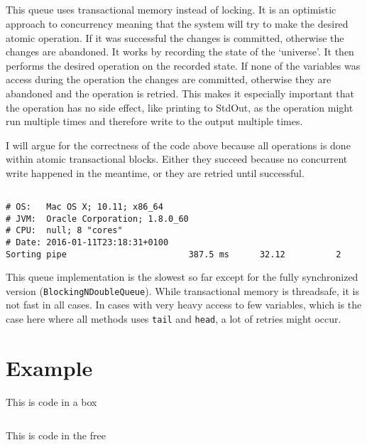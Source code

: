 \documentclass{ituhandin}
\begin{document}
\section{}
This queue uses transactional memory instead of locking. It is an optimistic approach to concurrency meaning that the system will try to make the desired atomic operation. If it was successful the changes is committed, otherwise the changes are abandoned. It works by recording the state of the `universe'. It then performs the desired operation on the recorded state. If none of the variables was access during the operation the changes are committed, otherwise they are abandoned and the operation is retried. This makes it especially important that the operation has no side effect, like printing to StdOut, as the operation might run multiple times and therefore write to the output multiple times.

I will argue for the correctness of the code above because all operations is done within atomic transactional blocks. Either they succeed because no concurrent write happened in the meantime, or they are retried until successful.

\section{}
\begin{lstlisting}[language={},frame={}]
# OS:   Mac OS X; 10.11; x86_64
# JVM:  Oracle Corporation; 1.8.0_60
# CPU:  null; 8 "cores"
# Date: 2016-01-11T23:18:31+0100
Sorting pipe                        387.5 ms      32.12          2
\end{lstlisting}

This queue implementation is the slowest so far except for the fully synchronized version (\texttt{BlockingNDoubleQueue}). While transactional memory is threadsafe, it is not fast in all cases. In cases with very heavy access to few variables, which is the case here where all methods uses \texttt{tail} and \texttt{head}, a lot of retries might occur.

\chapter{} %
\chapter{} %

\chapter*{Example}

This is code in a box

\begin{lstlisting}[caption=This is a caption]
\end{lstlisting}


This is code in the free

\begin{lstlisting}[frame={}]
\end{lstlisting}




\label{LastPage}
\end{document}
